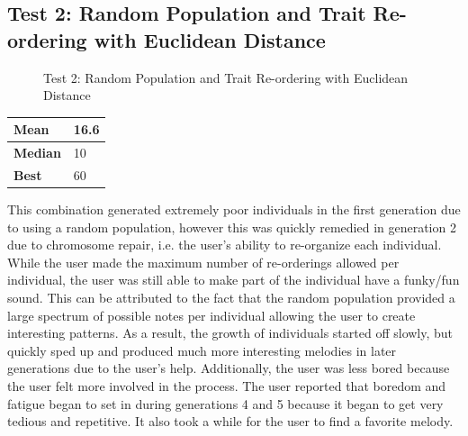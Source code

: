 \documentclass[12pt]{article} %
\begin{document}
\subsection{Test 2: Random Population and Trait Re-ordering with Euclidean Distance}
\begin{figure}[H]
\caption{Test 2: Random Population and Trait Re-ordering with Euclidean Distance}
\label{fig:test2}
\end{figure}
\begin{center}
	 \label{tab:stats_t2} 
    \begin{tabular}{|l|l|}
        \hline
	\bf{Mean}         & 16.6\\ \hline
	\bf{Median}         & 10 \\ \hline
	\bf{Best} & 60\\ \hline 
    \end{tabular}
\end{center}
This combination generated extremely poor individuals in the first generation due to using a random population, however this was quickly remedied in generation 2 due to chromosome repair, i.e. the user's ability to re-organize each individual. While the user made the maximum number of re-orderings allowed per individual, the user was still able to make part of the individual have a funky/fun sound. This can be attributed to the fact that the random population provided a large spectrum of possible notes per individual allowing the user to create interesting patterns. As a result, the growth of individuals started off slowly, but quickly sped up and produced much more interesting melodies in later generations due to the user's help. Additionally, the user was less bored because the user felt more involved in the process. The user reported that boredom and fatigue began to set in during generations 4 and 5 because it began to get very tedious and repetitive. It also took a while for the user to find a favorite melody. \\
\end{document}
